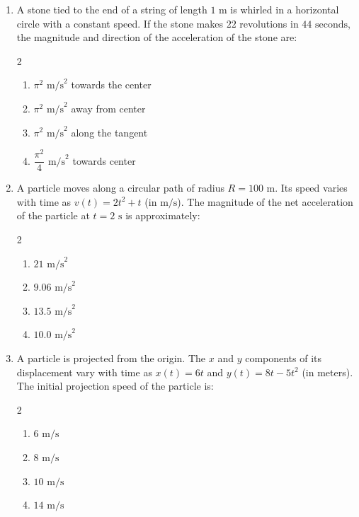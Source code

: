 \documentclass[11pt,a4paper]{article}
\begin{document}
\begin{enumerate}[label=\textbf{\textcolor{l1Green}{Q\arabic*.}},leftmargin=24pt,itemsep=10pt]
  \item A stone tied to the end of a string of length $1\text{ m}$ is whirled in a horizontal circle with a constant speed. If the stone makes $22$ revolutions in $44\text{ seconds}$, the magnitude and direction of the acceleration of the stone are:
  \begin{multicols}{2}
  \begin{enumerate}[label=\textbf{\textcolor{primaryDark}{(\Alph*)}},itemsep=2pt]
    \item $\pi^2\text{ m/s}^2$ towards the center
    \item $\pi^2\text{ m/s}^2$ away from center
    \item $\pi^2\text{ m/s}^2$ along the tangent
    \item $\dfrac{\pi^2}{4}\text{ m/s}^2$ towards center
  \end{enumerate}
  \end{multicols}

  \item A particle moves along a circular path of radius $R = 100\text{ m}$. Its speed varies with time as $v(t) = 2t^2 + t$ (in $\text{m/s}$). The magnitude of the net acceleration of the particle at $t = 2\text{ s}$ is approximately:
  \begin{multicols}{2}
  \begin{enumerate}[label=\textbf{\textcolor{primaryDark}{(\Alph*)}},itemsep=2pt]
    \item $21\text{ m/s}^2$
    \item $9.06\text{ m/s}^2$
    \item $13.5\text{ m/s}^2$
    \item $10.0\text{ m/s}^2$
  \end{enumerate}
  \end{multicols}

  \item A particle is projected from the origin. The $x$ and $y$ components of its displacement vary with time as $x(t) = 6t$ and $y(t) = 8t - 5t^2$ (in meters). The initial projection speed of the particle is:
  \begin{multicols}{2}
  \begin{enumerate}[label=\textbf{\textcolor{primaryDark}{(\Alph*)}},itemsep=2pt]
    \item $6\text{ m/s}$
    \item $8\text{ m/s}$
    \item $10\text{ m/s}$
    \item $14\text{ m/s}$
  \end{enumerate}
  \end{multicols}


\end{enumerate}
\end{document}
